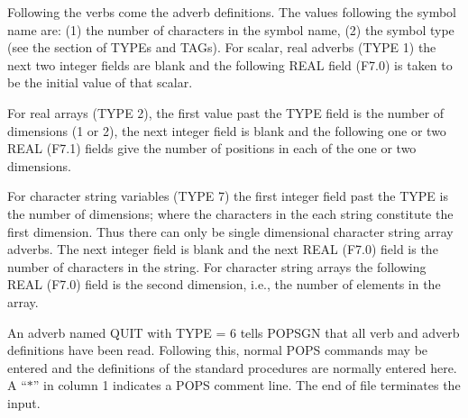 Following the verbs come the adverb definitions.  The values following
the symbol name are: (1) the number of characters in the symbol name,
(2) the symbol type (see the section of TYPEs and TAGs). For scalar,
real adverbs (TYPE 1) the next two integer fields are blank and the
following REAL field (F7.0) is taken to be the initial value of that
scalar.

For real arrays (TYPE 2), the first value past the TYPE field is the
number of dimensions (1 or 2), the next integer field is blank and the
following one or two REAL (F7.1) fields give the number of positions
in each of the one or two dimensions.

For character string variables (TYPE 7) the first integer field past
the TYPE is the number of dimensions; where the characters in the each
string constitute the first dimension.  Thus there can only be single
dimensional character string array adverbs. The next integer field is
blank and the next REAL (F7.0) field is the number of characters in
the string. For character string arrays the following REAL (F7.0)
field is the second dimension, i.e., the number of elements in the
array.

An adverb named QUIT with TYPE = 6 tells POPSGN that all verb and
adverb definitions have been read.  Following this, normal POPS
commands may be entered and the definitions of the standard procedures
are normally entered here.  A ``$\ast$'' in column 1 indicates a POPS
comment line. The end of file terminates the input.

